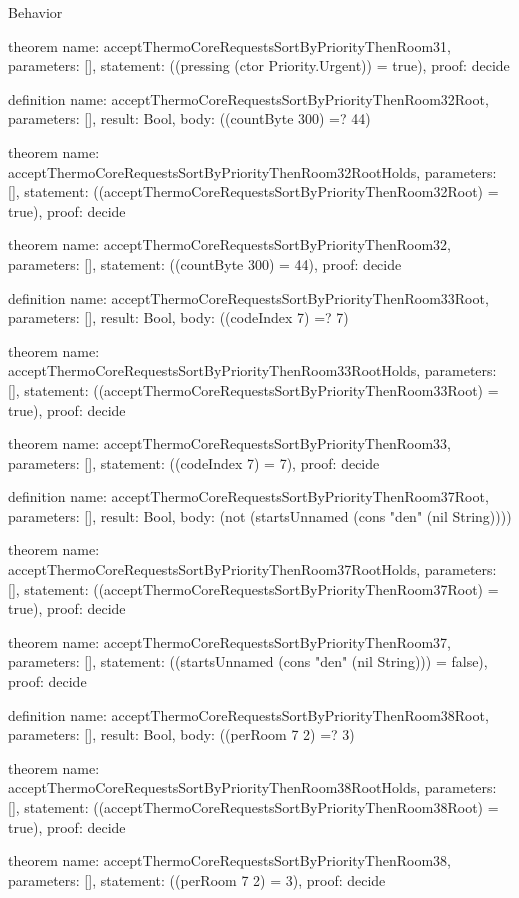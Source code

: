 \begin{lexlean}{Behavior}
\begin{semanticmodule}
theorem{
  name: acceptThermoCoreRequestsSortByPriorityThenRoom31,
  parameters: [],
  statement: ((pressing (ctor Priority.Urgent)) = true),
  proof: decide{}
}

definition{
  name: acceptThermoCoreRequestsSortByPriorityThenRoom32Root,
  parameters: [],
  result: Bool,
  body: ((countByte 300) =? 44)
}

theorem{
  name: acceptThermoCoreRequestsSortByPriorityThenRoom32RootHolds,
  parameters: [],
  statement: ((acceptThermoCoreRequestsSortByPriorityThenRoom32Root) = true),
  proof: decide{}
}

theorem{
  name: acceptThermoCoreRequestsSortByPriorityThenRoom32,
  parameters: [],
  statement: ((countByte 300) = 44),
  proof: decide{}
}

definition{
  name: acceptThermoCoreRequestsSortByPriorityThenRoom33Root,
  parameters: [],
  result: Bool,
  body: ((codeIndex 7) =? 7)
}

theorem{
  name: acceptThermoCoreRequestsSortByPriorityThenRoom33RootHolds,
  parameters: [],
  statement: ((acceptThermoCoreRequestsSortByPriorityThenRoom33Root) = true),
  proof: decide{}
}

theorem{
  name: acceptThermoCoreRequestsSortByPriorityThenRoom33,
  parameters: [],
  statement: ((codeIndex 7) = 7),
  proof: decide{}
}

definition{
  name: acceptThermoCoreRequestsSortByPriorityThenRoom37Root,
  parameters: [],
  result: Bool,
  body: (not (startsUnnamed (cons "den" (nil String))))
}

theorem{
  name: acceptThermoCoreRequestsSortByPriorityThenRoom37RootHolds,
  parameters: [],
  statement: ((acceptThermoCoreRequestsSortByPriorityThenRoom37Root) = true),
  proof: decide{}
}

theorem{
  name: acceptThermoCoreRequestsSortByPriorityThenRoom37,
  parameters: [],
  statement: ((startsUnnamed (cons "den" (nil String))) = false),
  proof: decide{}
}

definition{
  name: acceptThermoCoreRequestsSortByPriorityThenRoom38Root,
  parameters: [],
  result: Bool,
  body: ((perRoom 7 2) =? 3)
}

theorem{
  name: acceptThermoCoreRequestsSortByPriorityThenRoom38RootHolds,
  parameters: [],
  statement: ((acceptThermoCoreRequestsSortByPriorityThenRoom38Root) = true),
  proof: decide{}
}

theorem{
  name: acceptThermoCoreRequestsSortByPriorityThenRoom38,
  parameters: [],
  statement: ((perRoom 7 2) = 3),
  proof: decide{}
}


\end{semanticmodule}
\end{lexlean}
